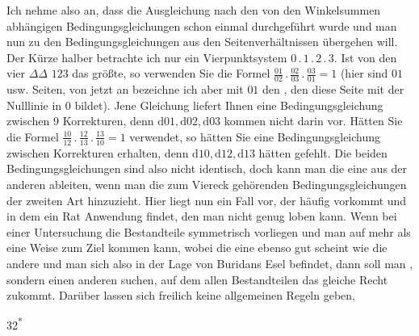 Ich nehme also an, dass die Ausgleichung nach den von den Winkelsummen abhängigen Bedingungsgleichungen schon einmal durchgeführt wurde und man nun zu den Bedingungsgleichungen aus den Seitenverhältnissen übergehen will. Der Kürze halber betrachte ich nur ein Vierpunktsystem \(0\,.\,1\,.\,2\,.\,3\). Ist von den vier \(\Delta\Delta\) \(123\) das größte, so verwenden Sie die Formel \(\frac{01}{02}\,.\,\frac{02}{03}\,.\,\frac{03}{01}=1\) (hier sind \(01\) usw. Seiten, von jetzt an bezeichne ich aber mit \(01\) den , den diese Seite mit der Nulllinie in \(0\) bildet). Jene Gleichung liefert Ihnen  eine Bedingungsgleichung zwischen \(9\) Korrekturen, denn \(\mathrm{d}01,\mathrm{d}02,\mathrm{d}03\) kommen nicht darin vor. Hätten Sie die Formel \(\frac{10}{12}\,.\,\frac{12}{13}\,.\,\frac{13}{10}=1\) verwendet, so hätten Sie eine Bedingungsgleichung zwischen  Korrekturen erhalten, denn \(\mathrm{d}10,\mathrm{d}12,\mathrm{d}13\) hätten gefehlt. Die beiden Bedingungsgleichungen sind also nicht identisch, doch kann man die eine aus der anderen ableiten, wenn man die zum Viereck gehörenden Bedingungsgleichungen der zweiten Art hinzuzieht. Hier liegt nun ein Fall vor, der häufig vorkommt und in dem ein Rat Anwendung findet, den man nicht genug loben kann. Wenn bei einer Untersuchung die Bestandteile symmetrisch vorliegen und man auf mehr als eine Weise zum Ziel kommen kann, wobei die eine ebenso gut scheint wie die andere und man sich also in der Lage von Buridans Esel befindet, dann soll man , sondern einen anderen suchen, auf dem allen Bestandteilen das gleiche Recht zukommt. Darüber lassen sich freilich keine allgemeinen Regeln geben,
\par\smallskip
\noindent\hfill{\small 32\textsuperscript{*}}\hspace*{.12\linewidth}\par
